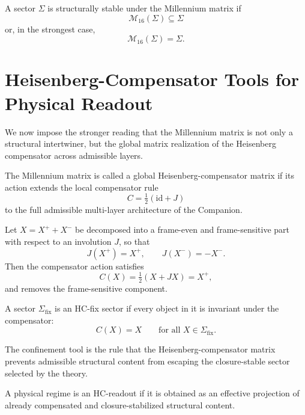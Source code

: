 \begin{definition}
A sector $\Sigma$ is structurally stable under the Millennium matrix if
\[
\mathcal M_{16}(\Sigma)\subseteq\Sigma
\]
or, in the strongest case,
\[
\mathcal M_{16}(\Sigma)=\Sigma.
\]
\end{definition}

\section{Heisenberg-Compensator Tools for Physical Readout}
\label{app:hc-tools}

\begin{remark}
We now impose the stronger reading that the Millennium matrix is not only a
structural intertwiner, but the global matrix realization of the Heisenberg
compensator across admissible layers.
\end{remark}

\begin{definition}
The Millennium matrix is called a global Heisenberg-compensator matrix if its
action extends the local compensator rule
\[
C=\tfrac12(\mathrm{id}+J)
\]
to the full admissible multi-layer architecture of the Companion.
\end{definition}

\begin{definition}
Let $X=X^+ + X^-$ be decomposed into a frame-even and frame-sensitive part
with respect to an involution $J$, so that
\[
J(X^+) = X^+,
\qquad
J(X^-) = -X^-.
\]
Then the compensator action satisfies
\[
C(X)=\tfrac12(X+JX)=X^+,
\]
and removes the frame-sensitive component.
\end{definition}

\begin{definition}
A sector $\Sigma_{\mathrm{fix}}$ is an HC-fix sector if every object in it is
invariant under the compensator:
\[
C(X)=X
\qquad\text{for all }X\in\Sigma_{\mathrm{fix}}.
\]
\end{definition}

\begin{definition}
The confinement tool is the rule that the Heisenberg-compensator matrix
prevents admissible structural content from escaping the closure-stable sector
selected by the theory.
\end{definition}

\begin{definition}
A physical regime is an HC-readout if it is obtained as an effective
projection of already compensated and closure-stabilized structural content.
\end{definition}

